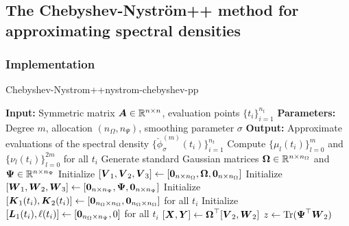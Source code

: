 \documentclass[12pt]{article}
\begin{document}
\subsection{The Chebyshev-Nyström++ method for approximating spectral densities}
\label{subsec:chebyshev-nystrom}

\subsubsection{Implementation}
\label{subsubsec:chebyshev-nystrom-implementation}

\begin{algo}{Chebyshev-Nystrom++}{nystrom-chebyshev-pp}
\begin{algorithmic}[1]
    \Statex \textbf{Input:} Symmetric matrix $\boldsymbol{A} \in \mathbb{R}^{n \times n}$, evaluation points $\{t_i\}_{i=1}^{n_t}$
    \Statex \textbf{Parameters:} Degree $m$, allocation $(n_{\Omega}, n_{\Psi})$,  smoothing parameter $\sigma$
    \Statex \textbf{Output:} Approximate evaluations of the spectral density $\{\breve{\phi}_{\sigma}^{(m)}(t_i)\}_{i=1}^{n_t}$
    \State Compute $\{\mu_l(t_i)\}_{l=0}^{m}$ and $\{\nu_l(t_i)\}_{l=0}^{2m}$ for all $t_i$ %
    \State Generate standard Gaussian matrices $\boldsymbol{\Omega} \in \mathbb{R}^{n \times n_{\Omega}}$ and $\boldsymbol{\Psi} \in \mathbb{R}^{n \times n_{\Psi}}$%
    \State Initialize $[\boldsymbol{V}_1, \boldsymbol{V}_2, \boldsymbol{V}_3] \gets [\boldsymbol{0}_{n \times n_{\Omega}}, \boldsymbol{\boldsymbol{\Omega}}, \boldsymbol{0}_{n \times n_{\Omega}}]$
    \State Initialize $[\boldsymbol{W}_1, \boldsymbol{W}_2, \boldsymbol{W}_3] \gets [\boldsymbol{0}_{n \times n_{\Psi}}, \boldsymbol{\Psi}, \boldsymbol{0}_{n \times n_{\Psi}}]$
    \State Initialize $[\boldsymbol{K}_1(t_i), \boldsymbol{K}_2(t_i)] \gets [\boldsymbol{0}_{n_{\Omega} \times n_{\Omega}}, \boldsymbol{0}_{n_{\Omega} \times n_{\Omega}}]$ for all $t_i$
    \State Initialize $[\boldsymbol{L}_1(t_i), \ell(t_i)] \gets [\boldsymbol{0}_{n_{\Omega} \times n_{\Psi}}, 0]$ for all $t_i$
    \State $[\boldsymbol{X}, \boldsymbol{Y}] \gets \boldsymbol{\boldsymbol{\Omega}}^{\top} [\boldsymbol{V}_2, \boldsymbol{W}_2]$  
      \State $z \gets \operatorname{Tr}(\boldsymbol{\Psi}^{\top} \boldsymbol{W}_2)$

\end{algorithmic}
\end{algo}
\end{document}
